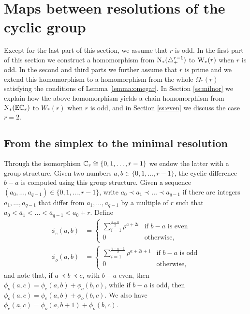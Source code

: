 
\section{Maps between resolutions of the cyclic group}\label{s:resolutions}

Except for the last part of this section, we assume that $r$ is odd. In the first part of this section we construct a homomorphism from $\operatorname{N}_*(\triangle_{+}^{r-1})$ to $\mathrm{W}_*(r)$ when $r$ is odd. In the second and third parts we further assume that $r$ is prime and we extend this homomorphism to a homomorphism from the whole $\Omega_*(r)$ satisfying the conditions of Lemma \ref{lemma:omegar}. In Section \ref{ss:milnor} we explain how the above homomorphism yields a chain homomorphism from $\operatorname{N}_*(\mathrm{E}\mathbb{C}_r)$ to $W_*(r)$ when $r$ is odd, and in Section \ref{ss:even} we discuss the case $r=2$.

\subsection{From the simplex to the minimal resolution} 

Through the isomorphism $\mathbb{C}_r \cong \{0,1,\ldots,r-1\}$ we endow the latter with a group structure. Given two numbers $a,b\in \{0,1,\ldots,r-1\}$, the cyclic difference $b-a$ is computed using this group structure. Given a sequence $(a_0,\ldots,a_{q-1})\in \{0,1,\ldots,r-1\}$, write $a_0\prec a_1\prec \ldots\prec a_{q-1}$ if there are integers $\bar{a}_1,\ldots,\bar{a}_{q-1}$ that differ from $a_1,\ldots,a_{q-1}$ by a multiple of $r$ such that $a_0<\bar{a}_1<\ldots<\bar{a}_{q-1}<a_0+r$. Define
\begin{align*}
    \phi_{e}(a,b) &= \begin{cases}
        \displaystyle \sum_{i=1}^{\frac{b-a}{2}} \rho^{a+2i} & \text{if $b-a$ is even} \\
        0 & \text{otherwise,}
    \end{cases}
    \\
    \phi_{o}(a,b) &= \begin{cases}
         \displaystyle \sum_{i=1}^{\frac{b-a-1}{2}} \rho^{a+2i+1} & \text{if $b-a$ is odd} \\
        0 & \text{otherwise,}
    \end{cases}
\end{align*}
and note that, if $a\prec b\prec c$, with $b-a$ even, then $\phi_o(a,c) = \phi_e(a,b) + \phi_o(b,c)$, while if $b-a$ is odd, then $\phi_o(a,c) = \phi_e(a,b) + \phi_o(b,c)$. We also have $\phi_e(a,c) = \phi_o(a,b+1)+\phi_o(b,c)$. 

